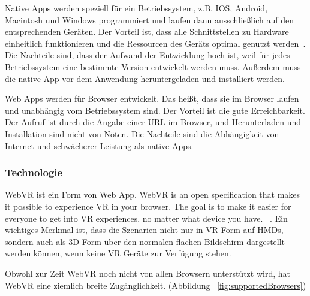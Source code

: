  Native Apps werden speziell für ein Betriebssystem, z.B. IOS, Android, Macintosh und Windows programmiert und laufen dann ausschließlich auf den entsprechenden Geräten. Der Vorteil ist, \glqq dass alle Schnittstellen zu Hardware einheitlich funktionieren und die Ressourcen des Geräts optimal genutzt werden\grqq\ \citep{22}. Die Nachteile sind, dass der Aufwand der Entwicklung hoch ist, weil für jedes Betriebssystem eine bestimmte Version entwickelt werden muss. Außerdem muss die native App vor dem Anwendung heruntergeladen und installiert werden.
 
 Web Apps werden für Browser entwickelt. Das heißt, dass sie im Browser laufen und unabhängig vom Betriebssystem sind. Der Vorteil ist die gute Erreichbarkeit. Der Aufruf ist durch die Angabe einer URL im Browser, und Herunterladen und Installation sind nicht von Nöten. Die Nachteile sind die Abhängigkeit von Internet und schwächerer Leistung als native Apps.
 
  \subsubsection{Technologie}
 WebVR ist ein Form von Web App. \glqq WebVR is an open specification that makes it possible to experience VR in your browser. The goal is to make it easier for everyone to get into VR experiences, no matter what device you have. \grqq\ \citep{21}. Ein wichtiges Merkmal ist, dass die Szenarien nicht nur in VR Form auf HMDs, sondern auch als 3D Form über den normalen flachen Bildschirm dargestellt werden können, wenn keine VR Geräte zur Verfügung stehen.
 
 Obwohl zur Zeit WebVR noch nicht von allen Browsern unterstützt wird, hat WebVR eine ziemlich breite Zugänglichkeit. (Abbildung ~\ref{fig:supportedBrowsers})
 
